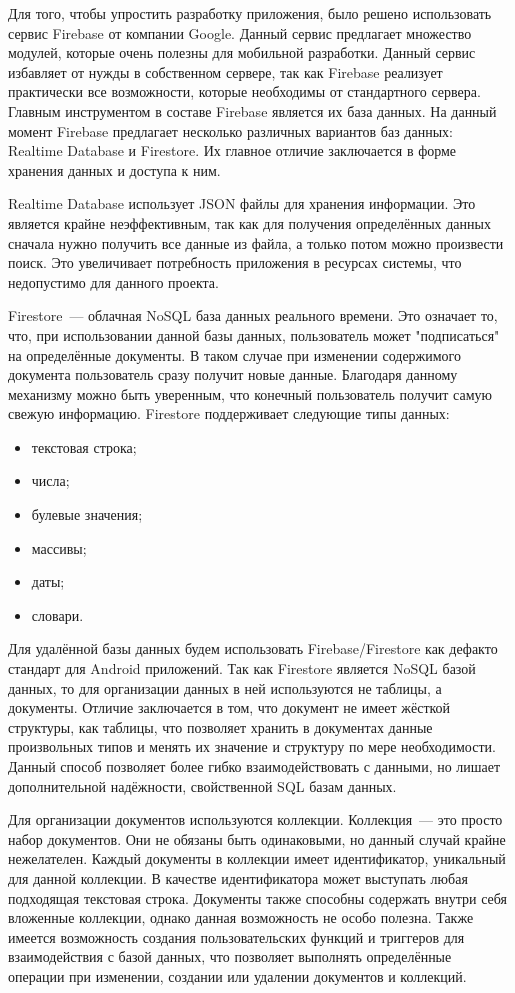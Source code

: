 Для того, чтобы упростить разработку приложения, было решено использовать сервис Firebase от компании Google. Данный сервис предлагает множество модулей, которые очень полезны для мобильной разработки. Данный сервис избавляет от нужды в собственном сервере, так как Firebase реализует практически все возможности, которые необходимы от стандартного сервера. Главным инструментом в составе Firebase является их база данных. На данный момент Firebase предлагает несколько различных вариантов баз данных: Realtime Database и Firestore. Их главное отличие заключается в форме хранения данных и доступа к ним. 

Realtime Database использует JSON файлы для хранения информации. Это является крайне неэффективным, так как для получения определённых данных сначала нужно получить все данные из файла, а только потом можно произвести поиск. Это увеличивает потребность приложения в ресурсах системы, что недопустимо для данного проекта. 

Firestore~--- облачная NoSQL база данных реального времени. Это означает то, что, при использовании данной базы данных, пользователь может "подписаться" на определённые документы. В таком случае при изменении содержимого документа пользователь сразу получит новые данные. Благодаря данному механизму можно быть уверенным, что конечный пользователь получит самую свежую информацию. Firestore поддерживает следующие типы данных:

\begin{itemize}
    \item текстовая строка;
    \item числа;
    \item булевые значения;
    \item массивы;
    \item даты;
    \item словари.
\end{itemize}

Для удалённой базы данных будем использовать Firebase/Firestore как дефакто стандарт для Android приложений. Так как Firestore является NoSQL базой данных, то для организации данных в ней используются не таблицы, а документы. Отличие заключается в том, что документ не имеет жёсткой структуры, как таблицы, что позволяет хранить в документах данные произвольных типов и менять их значение и структуру по мере необходимости. Данный способ позволяет более гибко взаимодействовать с данными, но лишает дополнительной надёжности, свойственной SQL базам данных.

Для организации документов используются коллекции. Коллекция~--- это просто набор документов. Они не обязаны быть одинаковыми, но данный случай крайне нежелателен. Каждый документы в коллекции имеет идентификатор, уникальный для данной коллекции. В качестве идентификатора может выступать любая подходящая текстовая строка. Документы также способны содержать внутри себя вложенные коллекции, однако данная возможность не особо полезна. Также имеется возможность создания пользовательских функций и триггеров для взаимодействия с базой данных, что позволяет выполнять определённые операции при изменении, создании или удалении документов и коллекций. 

